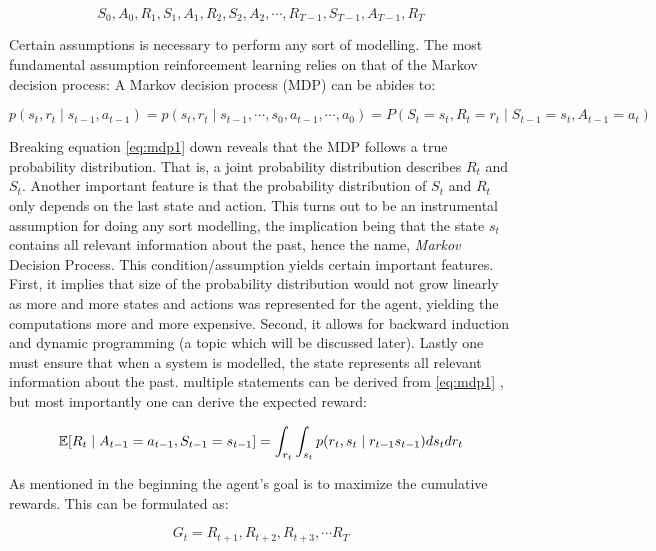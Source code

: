\begin{equation}
    S_0, A_0, R_1, S_1, A_1, R_2, S_2, A_2, \cdots ,R_{T-1}, S_{T-1}, A_{T-1}, R_{T}
\end{equation}

Certain assumptions is necessary to perform any sort of modelling. The most fundamental assumption reinforcement learning relies on that of the Markov decision process: A Markov decision process (MDP) can be abides to:

\begin{equation}\label{eq:mdp1}
    p(s_t, r_t \mid s_{t-1},  a_{t-1}) = p(s_t, r_t \mid s_{t-1},\cdots, s_{0}, a_{t-1}, \cdots, a_{0}) = P(S_t = s_t, R_t = r_t \mid S_{t-1} = s_t, A_{t-1} = a_t)
\end{equation}

Breaking equation \eqref{eq:mdp1} down reveals that the MDP follows a true probability distribution. That is, a joint probability distribution describes $R_t$ and $S_t$. Another important feature is that the probability distribution of $S_t$ and $R_t$ only depends on the last state and action. This turns out to be an instrumental assumption for doing any sort modelling, the implication being that the state $s_t$ contains all relevant information about the past, hence the name, \textit{Markov} Decision Process. This condition/assumption yields certain important features. First, it implies that size of the probability distribution would not grow linearly as more and more states and actions was represented for the agent, yielding the computations more and more expensive. Second, it allows for backward induction and dynamic programming (a topic which will be discussed later).  Lastly one must ensure that when a system is modelled, the state represents all relevant information about the past. multiple statements can be derived from \eqref{eq:mdp1} , but most importantly one can derive the expected reward:

\begin{equation}
    \mathbb{E}[R_t \mid A_{t-1} = a_{t-1}, S_{t-1} = {s_{t-1}}] = \int_{r_t} \int_{s_t} p(r_t, s_t \mid r_{t-1} s_{t-1}) d s_t d r_t 
\end{equation}

As mentioned in the beginning the agent's goal is to maximize the cumulative rewards. This can be formulated as:

\begin{equation}\label{eq:cum_rewards}
   G_t = R_{t+1}, R_{t+2}, R_{t+3}, \cdots R_{T}
\end{equation}

